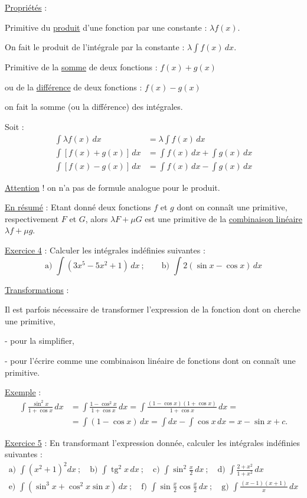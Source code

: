 \uline{Propriétés} :

Primitive du \uline{produit} d'une fonction par une constante : $\lambda f(x)$.

On fait le produit de l'intégrale par la constante : $\lambda\int f(x)\,dx$.

Primitive de la \uline{somme} de deux fonctions : $f(x)+g(x)$

ou de la \uline{différence} de deux fonctions : $f(x)-g(x)$

on fait la somme (ou la différence) des intégrales.

Soit :
\[
\begin{aligned}
\int\lambda f(x)\,dx&=\lambda\int f(x)\,dx\\
\int[f(x)+g(x)]\,dx&=\int f(x)\,dx+\int g(x)\,dx\\
\int[f(x)-g(x)]\,dx&=\int f(x)\,dx-\int g(x)\,dx
\end{aligned}
\]

\uline{Attention} ! on n'a pas de formule analogue pour le produit.

\uline{En résumé} : Etant donné deux fonctions $f$ et $g$ dont on connaît une primitive, respectivement $F$ et $G$, alors $\lambda F+\mu G$ est une primitive de la \uline{combinaison linéaire} $\lambda f+\mu g$.

\uline{Exercice 4} : Calculer les intégrales indéfinies suivantes :
\[
\text{a) }\int(3x^5-5x^2+1)\,dx\ ;\qquad
\text{b) }\int2(\sin x-\cos x)\,dx
\]

\uline{Transformations} :

Il est parfois nécessaire de transformer l'expression de la fonction dont on cherche une primitive,

- pour la simplifier,

- pour l'écrire comme une combinaison linéaire de fonctions dont on connaît une primitive.

\uline{Exemple} :
\[
\begin{aligned}
\int\frac{\sin^2x}{1+\cos x}\,dx
&=\int\frac{1-\cos^2x}{1+\cos x}\,dx
=\int\frac{(1-\cos x)(1+\cos x)}{1+\cos x}\,dx=\\
&=\int(1-\cos x)\,dx
=\int dx-\int\cos x\,dx=x-\sin x+c.
\end{aligned}
\]

\uline{Exercice 5} : En transformant l'expression donnée, calculer les intégrales indéfinies suivantes :
\[
\begin{gathered}
\text{a) }\int(x^2+1)^2dx\ ;\quad
\text{b) }\int\operatorname{tg}^2x\,dx\ ;\quad
\text{c) }\int\sin^2\frac x2\,dx\ ;\quad
\text{d) }\int\frac{2+x^2}{1+x^2}\,dx\\
\text{e) }\int(\sin^3x+\cos^2x\sin x)\,dx\ ;\quad
\text{f) }\int\sin\frac x2\cos\frac x2\,dx\ ;\quad
\text{g) }\int\frac{(x-1)(x+1)}x\,dx
\end{gathered}
\]

